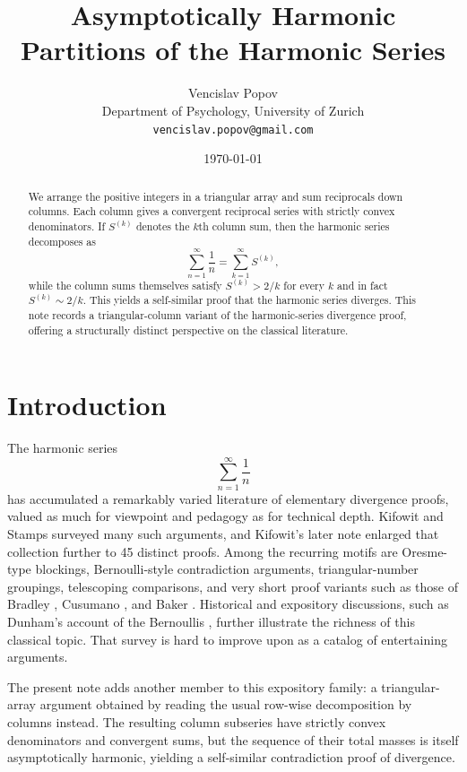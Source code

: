 \documentclass[11pt]{article}
\title{Asymptotically Harmonic Partitions of the Harmonic Series}
\author{Vencislav Popov \\
Department of Psychology, University of Zurich \\
\texttt{vencislav.popov@gmail.com}}
\date{\today}
\begin{document}
\maketitle

\begin{abstract}
We arrange the positive integers in a triangular array and sum reciprocals down columns. Each column gives a convergent reciprocal series with strictly convex denominators. If $S^{(k)}$ denotes the $k$th column sum, then the harmonic series decomposes as
\[
\sum_{n=1}^{\infty} \frac{1}{n} = \sum_{k=1}^{\infty} S^{(k)},
\]
while the column sums themselves satisfy $S^{(k)} > 2/k$ for every $k$ and in fact $S^{(k)} \sim 2/k$. This yields a self-similar proof that the harmonic series diverges. This note records a triangular-column variant of the harmonic-series divergence proof, offering a structurally distinct perspective on the classical literature.
\end{abstract}

\section{Introduction}

The harmonic series
\[
\sum_{n=1}^{\infty}\frac1n
\]
has accumulated a remarkably varied literature of elementary divergence proofs, valued as much for viewpoint and pedagogy as for technical depth. Kifowit and Stamps \cite{KifowitStamps2006} surveyed many such arguments, and Kifowit's later note \cite{Kifowit2019} enlarged that collection further to 45 distinct proofs. Among the recurring motifs are Oresme-type blockings, Bernoulli-style contradiction arguments, triangular-number groupings, telescoping comparisons, and very short proof variants such as those of Bradley \cite{Bradley2000}, Cusumano \cite{Cusumano1998, Cusumano2012}, and Baker \cite{Baker2015}. Historical and expository discussions, such as Dunham’s account of the Bernoullis \cite{Dunham1987}, further illustrate the richness of this classical topic. That survey is hard to improve upon as a catalog of entertaining arguments.

The present note adds another member to this expository family: a triangular-array argument obtained by reading the usual row-wise decomposition by columns instead. The resulting column subseries have strictly convex denominators and convergent sums, but the sequence of their total masses is itself asymptotically harmonic, yielding a self-similar contradiction proof of divergence.
\end{document}
